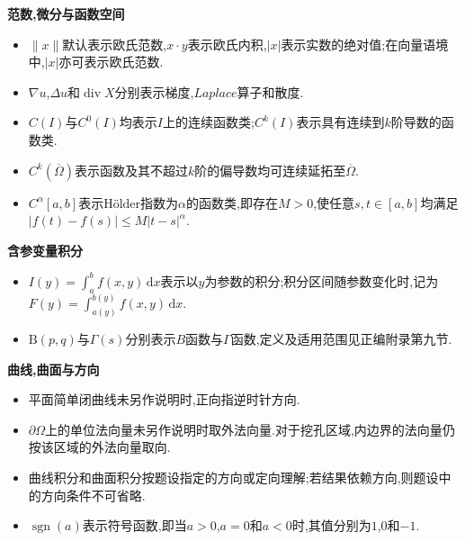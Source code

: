 \documentclass[a4paper,12pt,fleqn,openany,twoside,fontset=windows]{ctexbook}
\begin{document}
\begin{booknotelongbody}
\textbf{范数,微分与函数空间}

\begin{itemize}[leftmargin=2\ccwd,itemsep=0.5em,topsep=0.4em]
    \item $\displaystyle\lVert x\rVert$默认表示欧氏范数,$\displaystyle x\cdot y$表示欧氏内积,$\displaystyle|x|$表示实数的绝对值;在向量语境中,$\displaystyle|x|$亦可表示欧氏范数.
    \item $\displaystyle\nabla u$,$\displaystyle\Delta u$和$\displaystyle\operatorname{div}X$分别表示梯度,$Laplace$算子和散度.
    \item $\displaystyle C(I)$与$\displaystyle C^0(I)$均表示$\displaystyle I$上的连续函数类;$\displaystyle C^k(I)$表示具有连续到$\displaystyle k$阶导数的函数类.
    \item $\displaystyle C^k(\overline\Omega)$表示函数及其不超过$\displaystyle k$阶的偏导数均可连续延拓至$\displaystyle\overline\Omega$.
    \item $\displaystyle C^\alpha[a,b]$表示$\text{Hölder}$指数为$\displaystyle\alpha$的函数类,即存在$\displaystyle M>0$,使任意$\displaystyle s,t\in[a,b]$均满足$\displaystyle|f(t)-f(s)|\leq M|t-s|^\alpha$.
\end{itemize}

\textbf{含参变量积分}

\begin{itemize}[leftmargin=2\ccwd,itemsep=0.5em,topsep=0.4em]
    \item $\displaystyle I(y)=\int_a^b f(x,y)\,\mathrm{d}x$表示以$\displaystyle y$为参数的积分;积分区间随参数变化时,记为$\displaystyle F(y)=\int_{a(y)}^{b(y)}f(x,y)\,\mathrm{d}x$.
    \item $\displaystyle\mathrm{B}(p,q)$与$\displaystyle\Gamma(s)$分别表示$\displaystyle B$函数与$\displaystyle\Gamma$函数,定义及适用范围见正编附录第九节.
\end{itemize}

\textbf{曲线,曲面与方向}

\begin{itemize}[leftmargin=2\ccwd,itemsep=0.5em,topsep=0.4em]
    \item 平面简单闭曲线未另作说明时,正向指逆时针方向.
    \item $\displaystyle\partial\Omega$上的单位法向量未另作说明时取外法向量.对于挖孔区域,内边界的法向量仍按该区域的外法向量取向.
    \item 曲线积分和曲面积分按题设指定的方向或定向理解;若结果依赖方向,则题设中的方向条件不可省略.
    \item $\displaystyle\operatorname{sgn}(a)$表示符号函数,即当$\displaystyle a>0$,$\displaystyle a=0$和$\displaystyle a<0$时,其值分别为$\displaystyle1$,$\displaystyle0$和$\displaystyle-1$.
\end{itemize}


\end{booknotelongbody}
\pagestyle{main}
\clearpage
\end{document}
